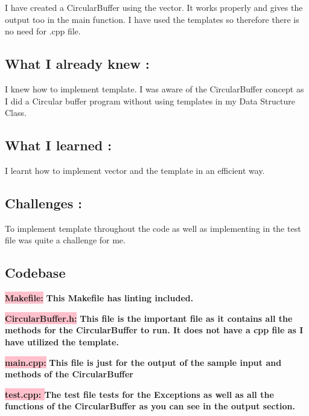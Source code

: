 I have created a CircularBuffer using the vector. It works properly and gives the output too in the main function. I have used the templates so therefore there is no need for .cpp file. 

\subsection{What I already knew :}

I knew how to implement template. I was aware of the CircularBuffer concept as I did a Circular buffer program without using templates in my Data Structure Class.

\subsection{What I learned :}

I learnt how to implement vector and the template in an efficient way.

\subsection{Challenges :}

To implement template throughout the code as well as implementing in the test file was quite a challenge for me.

\subsection{Codebase}\label{sec:ps4a:code}

\textbf{\colorbox{pink}{Makefile:}} \newline \textbf{This Makefile has linting included.}



\textbf{\colorbox{pink}{CircularBuffer.h:}} \newline \textbf{This file is the important file as it contains all the methods for the CircularBuffer to run. It does not have a cpp file as I have utilized the template.}


\textbf{\colorbox{pink}{main.cpp:}} \newline \textbf{This file is just for the output of the sample input and methods of the CircularBuffer}


\newpage
\textbf{\colorbox{pink}{test.cpp: }} \newline \textbf{The test file tests for the Exceptions as well as all the functions of the CircularBuffer as you can see in the output section.}


